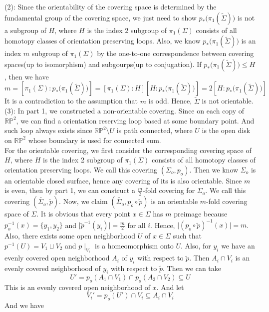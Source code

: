 \documentclass[12pt]{amsart}
\newcommand{\rp}{\mathbb{RP}^2}
\begin{document}
(2): Since the orientability of the covering space is determined by the fundamental group of the covering space, we just need to show $p_\ast\big(\pi_1(\tilde{\Sigma})\big)$ is not a subgroup of $H$, where $H$ is the index 2 subgroup of $\pi_1(\Sigma)$ consists of all homotopy classes of orientation preserving loops. Also, we know $p_\ast\big(\pi_1(\tilde{\Sigma})\big)$ is an index $m$ subgroup of $\pi_1(\Sigma)$ by the one-to-one correspondence between covering spaces(up to isomorphism) and subgourps(up to conjugation). If $p_\ast\big(\pi_1(\tilde{\Sigma})\big)\leq H$, then we have 
\[m=[\pi_1(\Sigma): p_\ast\big(\pi_1(\tilde{\Sigma})\big)]=[\pi_1(\Sigma): H][H: p_\ast\big(\pi_1(\tilde{\Sigma})\big)]=2[H: p_\ast\big(\pi_1(\tilde{\Sigma})\big)]\]
It is a contradiction to the assumption that $m$ is odd. Hence, $\tilde{\Sigma}$ is not orientable.\\
(3): In part 1, we constructed a non-orientable covering. Since on each copy of $\rp$, we can find a orientation reserving loop based at some boundary point. And such loop always exists since $\rp\setminus U$ is path connected, where $U$ is the open disk on $\rp$ whose boundary is used for connected sum.\\
For the orientable covering, we first consider the corresponding covering space of $H$, where $H$ is the index 2 subgroup of $\pi_1(\Sigma)$ consists of all homotopy classes of orientation preserving loops. We call this covering $(\Sigma_o,p_o)$. Then we know $\Sigma_o$ is an orientable closed surface, hence any covering of its is also orientable. Since $m$ is even, then by part 1, we can construct a $\frac{m}{2}$-fold covering for $\Sigma_o$. We call this covering $(\tilde{\Sigma_o},\tilde{p})$. Now, we claim $(\tilde{\Sigma_o},p_o\circ \tilde{p})$ is an orientable $m$-fold covering space of $\Sigma$. It is obvious that every point $x\in\Sigma$ has $m$ preimage because $p_o^{-1}(x)=\{y_1,y_2\}$ and $\mid\tilde{p}^{-1}(y_i)\mid=\frac{m}{2}$ for all $i$. Hence, $\mid (p_o\circ \tilde{p})^{-1}(x)\mid =m$. \\
Also, there exists some open neighborhood $U$ of $x\in\Sigma$ such that $p^{-1}(U)=V_1\sqcup V_2$ and $p\mid_{V_i}$ is a homeomorphism onto $U$. Also, for $y_i$ we have an evenly covered open neighborhood $A_i$ of $y_i$ with respect to $\tilde{p}$. Then $A_i\cap V_i$ is an evenly covered neighborhood of $y_i$ with respect to $\tilde{p}$. Then we can take 
\[U'=p_o(A_1\cap V_1)\cap p_o(A_2\cap V_2)\subseteq U\] 
This is an evenly covered open neighborhood of $x$.
And let 
\[V_i'=p_o(U')\cap V_i\subseteq A_i\cap V_i\] And we have 
\end{document}
